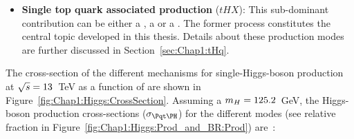 \begin{itemize}
  \item \textbf{Single top quark associated production} ($tHX$): 
  				This sub-dominant contribution can be either a \tHq, a \tWH or a \schannel. The former 
				process constitutes the central topic 
				developed in this thesis. Details about these production modes are further
				discussed in Section~\ref{sec:Chap1:tHq}.
  
\end{itemize}
  




The cross-section of the different mechanisms for single-Higgs-boson %
production at $\sqrt{s}=13$~TeV as a function of \mH are shown in Figure~\ref{fig:Chap1:Higgs:CrossSection}.
Assuming a $m_{H}=125.2$~GeV, the Higgs-boson production cross-sections ($\sigma_{\tH}$) for the different
modes (see relative fraction in Figure~\ref{fig:Chap1:Higgs:Prod_and_BR:Prod}) are~\cite{LHCHiggsCrossSectionWorkingGroup:2016ypw}:

